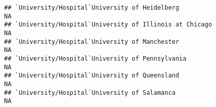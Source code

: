 \documentclass[]{article}
\begin{document}
\begin{verbatim}
## `University/Hospital`University of Heidelberg                                                                                                                                                                                                                                                                                                                                                                                                                                         NA
## `University/Hospital`University of Illinois at Chicago                                                                                                                                                                                                                                                                                                                                                                                                                                NA
## `University/Hospital`University of Manchester                                                                                                                                                                                                                                                                                                                                                                                                                                         NA
## `University/Hospital`University of Pennsylvania                                                                                                                                                                                                                                                                                                                                                                                                                                       NA
## `University/Hospital`University of Queensland                                                                                                                                                                                                                                                                                                                                                                                                                                         NA
## `University/Hospital`University of Salamanca                                                                                                                                                                                                                                                                                                                                                                                                                                          NA

\end{verbatim}
\end{document}
